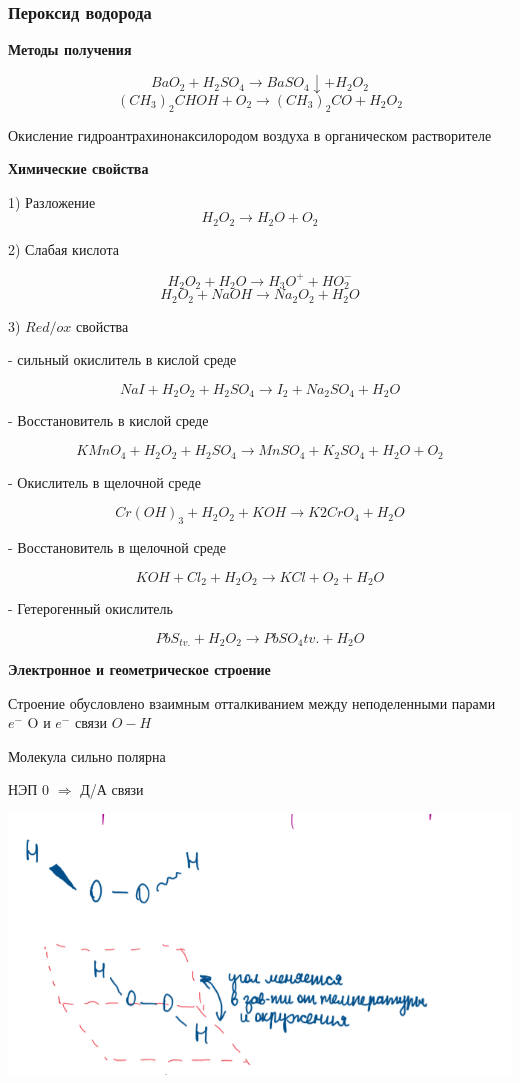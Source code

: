 \documentclass[14pt,a4paper]{scrartcl}
\begin{document}
\subsubsection{Пероксид водорода}

\textbf{Методы получения}

$$BaO_2 + H_2SO_4 \rightarrow BaSO_4\downarrow + H_2O_2$$
$$ (CH_3)_2CHOH + O_2 \rightarrow (CH_3)_2CO + H_2O_2$$

Окисление гидроантрахинонаксилородом воздуха в органическом растворителе

\textbf{Химические свойства}

1) Разложение
$$H_2O_2 \rightarrow H_2O + O_2$$

2) Слабая кислота

$$H_2O_2 + H_2O \rightarrow H_3O^+ + HO_2^-$$
$$H_2O_2 + NaOH \rightarrow Na_2O_2 + H_2O$$

3) $Red/ox$ свойства

- сильный окислитель в кислой среде

$$NaI + H_2O_2 + H_2SO_4 \rightarrow I_2 + Na_2SO_4 + H_2O$$

- Восстановитель в кислой среде

$$KMnO_4 + H_2O_2 + H_2SO_4 \rightarrow MnSO_4 + K_2SO_4 + H_2O + O_2$$

- Окислитель в щелочной среде

$$Cr(OH)_3 + H_2O_2 + KOH \rightarrow K2CrO_4 + H_2O$$

- Восстановитель в щелочной среде

$$KOH + Cl_2 + H_2O_2 \rightarrow KCl + O_2 + H_2O$$

- Гетерогенный окислитель

$$PbS_{tv.} + H_2O_2 \rightarrow PbSO_4{tv.} + H_2O$$

\textbf{Электронное и геометрическое строение}

Строение обусловлено взаимным отталкиванием между неподеленными парами $e^-$ O и $e^-$ связи $O-H$

Молекула сильно полярна

НЭП 0 $\Rightarrow$ Д/А связи

\includegraphics[scale=0.95]{6v3.png}
\end{document}
